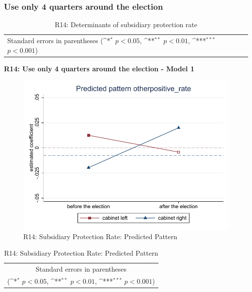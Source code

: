 \documentclass[10pt,a4paper]{scrartcl}
\begin{document}


\clearpage
\FloatBarrier
\subsubsection{Use only 4 quarters around the election}
\begin{table}[!ht]\centering
	\renewcommand{\arraystretch}{1.25}
	\small
	\def\sym#1{\ifmmode^{#1}\else\(^{#1}\)\fi}
	\caption{R14: Determinants of subsidiary protection rate}
	\begin{tabular}{l*{3}{c}}
		\hline\hline
		
		\hline\hline
		\multicolumn{4}{l}{\footnotesize Standard errors in parentheses (\sym{*} \(p<0.05\), \sym{**} \(p<0.01\), \sym{***} \(p<0.001\))}\\
	\end{tabular}
\end{table}

\clearpage
\textbf{R14: Use only 4 quarters around the election - Model 1}
\begin{figure}[!ht]
	\centering
	\includegraphics[width=1\textwidth]{figures_edited/otherpositive_rate_graph1_R14.pdf}
	\caption{R14: Subsidiary Protection Rate: Predicted Pattern}
\end{figure}

\begin{table}[!ht]\centering
	\renewcommand{\arraystretch}{1.25}
	\def\sym#1{\ifmmode^{#1}\else\(^{#1}\)\fi}
	\caption{R14: Subsidiary Protection Rate: Predicted Pattern}
	\begin{tabular}{l*{2}{c}}
		\hline\hline
		
		\hline\hline
		\multicolumn{3}{c}{\footnotesize Standard errors in parentheses} \\
		\multicolumn{3}{c}{\footnotesize (\sym{*} \(p<0.05\), \sym{**} \(p<0.01\), \sym{***} \(p<0.001\))}\\
	\end{tabular}
\end{table}
\end{document}
